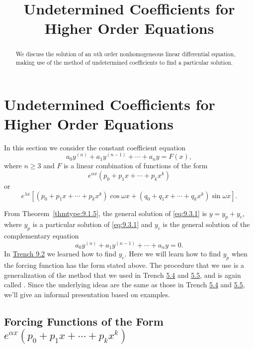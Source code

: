 \documentclass{ximera}
\title{Undetermined Coefficients for Higher Order Equations}%
\begin{document}
\begin{abstract}
We discuss the solution of an $n$th order nonhomogeneous linear differential equation, making use of the method of undetermined coefficients to find a particular solution.
\end{abstract}

\maketitle

\section*{Undetermined Coefficients for Higher Order Equations}

In this section we consider the constant coefficient equation
\begin{equation}
 \label{eq:9.3.1} a_0y^{(n)}+a_1y^{(n-1)}+\cdots+a_ny=F(x),
\end{equation}
where $n\geq 3$ and $F$ is a linear combination of
functions of the form
$$
e^{\alpha x}\left(p_0+p_1x+\cdots+p_kx^k\right)
$$
or
$$
e^{\lambda x}\left[\left(p_0+p_1x+\cdots+p_kx^k\right)
\cos\omega x+
\left(q_0+q_1x+\cdots+q_kx^k\right)
\sin\omega x\right].
$$

From Theorem~\ref{thmtype:9.1.5}, the general solution of \eqref{eq:9.3.1} is
$y=y_p+y_c$, where $y_p$ is a particular solution of \eqref{eq:9.3.1} and
$y_c$ is the general solution of the complementary equation
$$
a_0y^{(n)}+a_1y^{(n-1)}+\cdots+a_ny=0.
$$
In \href{https://ximera.osu.edu/ode/main/higherOrderConstCoeff/higherOrderConstCoeff}{Trench 9.2} we learned how to find $y_c$. Here
we
will learn how to find $y_p$ when the forcing function has the form stated
above. The procedure that we  use is a generalization of the
method that we used in Trench \href{https://ximera.osu.edu/ode/main/undeterminedCoeff/undeterminedCoeff}{5.4} and
\href{https://ximera.osu.edu/ode/main/undeterminedCoeff2/undeterminedCoeff2}{5.5}, and is again called
. Since
the underlying ideas are the same as those in
Trench \href{https://ximera.osu.edu/ode/main/undeterminedCoeff/undeterminedCoeff}{5.4} and
\href{https://ximera.osu.edu/ode/main/undeterminedCoeff2/undeterminedCoeff2}{5.5},
we'll give  an informal presentation based on
examples.

\subsection*{Forcing Functions of the Form
$e^{\alpha x}\left(p_0+p_1x+\cdots+p_kx^k\right)$}
\end{document}

